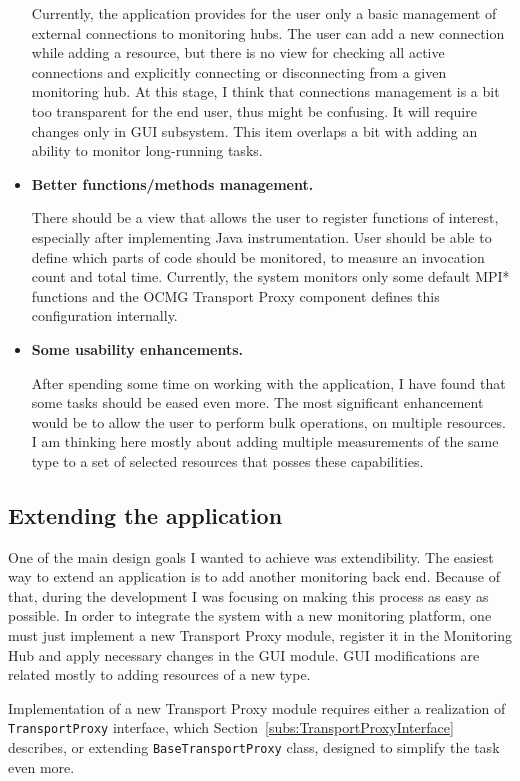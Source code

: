 \begin{itemize}
Currently, the application provides for the user only a basic management of external connections to monitoring hubs. The user can add a new connection while adding a resource, but there is no view for checking all active connections and explicitly connecting or disconnecting from a given monitoring hub. At this stage, I think that connections management is a bit too transparent for the end user, thus might be confusing. It will require changes only in GUI subsystem. This item overlaps a bit with adding an ability to monitor long-running tasks.

\item{\bf Better functions/methods management.}

There should be a view that allows the user to register functions of interest, especially after implementing Java instrumentation. User should be able to define which parts of code should be monitored, to measure an invocation count and total time. Currently, the system monitors only some default MPI* functions and the OCMG Transport Proxy component defines this configuration internally.

\item {\bf Some usability enhancements.}

After spending some time on working with the application, I have found that some tasks should be eased even more. The most significant enhancement would be to allow the user to perform bulk operations, on multiple resources. I am thinking here mostly about adding multiple measurements of the same type to a set of selected resources that posses these capabilities.

\end{itemize}

\subsection{Extending the application}

One of the main design goals I wanted to achieve was extendibility. The easiest way to extend an application is to add another monitoring back end. Because of that, during the development I was focusing on making this process as easy as possible. In order to integrate the system with a new monitoring platform, one must just implement a new Transport Proxy module, register it in the Monitoring Hub and apply necessary changes in the GUI module. GUI modifications are related mostly to adding resources of a new type.

Implementation of a new Transport Proxy module requires either a realization of \texttt{TransportProxy} interface, which Section~\ref{subs:TransportProxyInterface} describes, or extending \texttt{BaseTransportProxy} class, designed to simplify the task even more.

